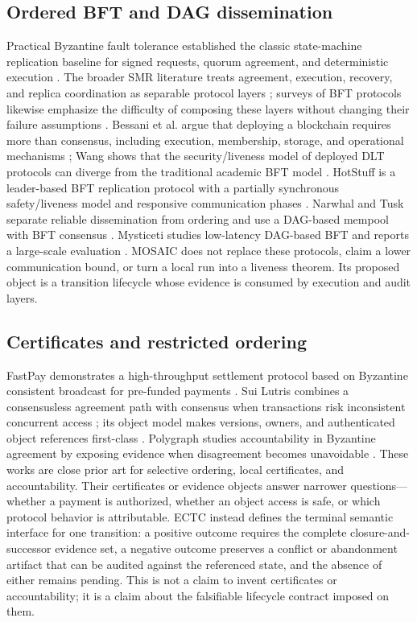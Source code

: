 \documentclass{ledger}
\begin{document}
\subsection{Ordered BFT and DAG dissemination}
Practical Byzantine fault tolerance established the classic state-machine replication baseline for signed requests, quorum agreement, and deterministic execution \cite{Castro1999PBFT}. The broader SMR literature treats agreement, execution, recovery, and replica coordination as separable protocol layers \cite{Cachin2010SMRByzantine}; surveys of BFT protocols likewise emphasize the difficulty of composing these layers without changing their failure assumptions \cite{Aublin2015Next700BFT,Distler2021BFTSMR}. Bessani et al. argue that deploying a blockchain requires more than consensus, including execution, membership, storage, and operational mechanisms \cite{Bessani2020ConsensusBeginning}; Wang shows that the security/liveness model of deployed DLT protocols can diverge from the traditional academic BFT model \cite{Wang2022DLTBFT}. HotStuff is a leader-based BFT replication protocol with a partially synchronous safety/liveness model and responsive communication phases \cite{Yin2019HotStuff}. Narwhal and Tusk separate reliable dissemination from ordering and use a DAG-based mempool with BFT consensus \cite{Danezis2022Narwhal}. Mysticeti studies low-latency DAG-based BFT and reports a large-scale evaluation \cite{Babel2025Mysticeti}. MOSAIC does not replace these protocols, claim a lower communication bound, or turn a local run into a liveness theorem. Its proposed object is a transition lifecycle whose evidence is consumed by execution and audit layers.

\subsection{Certificates and restricted ordering}
FastPay demonstrates a high-throughput settlement protocol based on Byzantine consistent broadcast for pre-funded payments \cite{Baudet2020FastPay}. Sui Lutris combines a consensusless agreement path with consensus when transactions risk inconsistent concurrent access \cite{Blackshear2024SuiLutris}; its object model makes versions, owners, and authenticated object references first-class \cite{SuiObjectModel}. Polygraph studies accountability in Byzantine agreement by exposing evidence when disagreement becomes unavoidable \cite{Civit2021Polygraph}. These works are close prior art for selective ordering, local certificates, and accountability. Their certificates or evidence objects answer narrower questions—whether a payment is authorized, whether an object access is safe, or which protocol behavior is attributable. ECTC instead defines the terminal semantic interface for one transition: a positive outcome requires the complete closure-and-successor evidence set, a negative outcome preserves a conflict or abandonment artifact that can be audited against the referenced state, and the absence of either remains pending. This is not a claim to invent certificates or accountability; it is a claim about the falsifiable lifecycle contract imposed on them.
\end{document}

